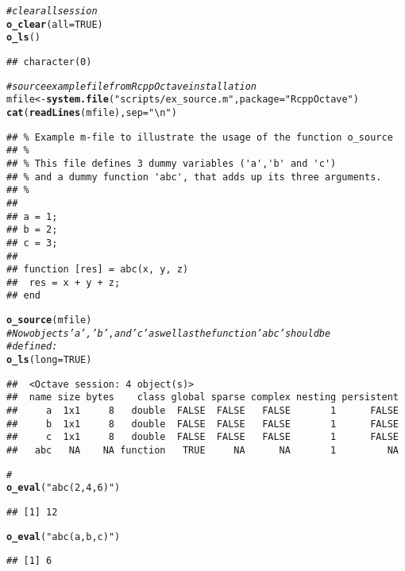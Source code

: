 \documentclass[english,10pt,a4paper]{article}\usepackage[]{graphicx}\usepackage[]{color}
\makeatletter
\newcommand{\hlnum}[1]{\textcolor[rgb]{0.686,0.059,0.569}{#1}}%
\newcommand{\hlstr}[1]{\textcolor[rgb]{0.192,0.494,0.8}{#1}}%
\newcommand{\hlcom}[1]{\textcolor[rgb]{0.678,0.584,0.686}{\textit{#1}}}%
\newcommand{\hlstd}[1]{\textcolor[rgb]{0.345,0.345,0.345}{#1}}%
\newcommand{\hlkwb}[1]{\textcolor[rgb]{0.69,0.353,0.396}{#1}}%
\newcommand{\hlkwc}[1]{\textcolor[rgb]{0.333,0.667,0.333}{#1}}%
\newcommand{\hlkwd}[1]{\textcolor[rgb]{0.737,0.353,0.396}{\textbf{#1}}}%
\newenvironment{kframe}{%
 \def\at@end@of@kframe{}%
 \ifinner\ifhmode%
  \def\at@end@of@kframe{\end{minipage}}%
  \begin{minipage}{\columnwidth}%
 \fi\fi%
 \def\FrameCommand##1{\hskip\@totalleftmargin \hskip-\fboxsep
 \colorbox{shadecolor}{##1}\hskip-\fboxsep
     \hskip-\linewidth \hskip-\@totalleftmargin \hskip\columnwidth}%
 \MakeFramed {\advance\hsize-\width
   \@totalleftmargin\z@ \linewidth\hsize
   \@setminipage}}%
 {\par\unskip\endMakeFramed%
 \at@end@of@kframe}
\newenvironment{knitrout}{}{} %
\makeatother
\begin{document}
\begin{knitrout}
\color{fgcolor}\begin{kframe}
\begin{alltt}
\hlcom{# clear all session}
\hlkwd{o_clear}\hlstd{(}\hlkwc{all} \hlstd{=} \hlnum{TRUE}\hlstd{)}
\hlkwd{o_ls}\hlstd{()}
\end{alltt}
\begin{verbatim}
## character(0)
\end{verbatim}
\begin{alltt}
\hlcom{# source example file from RcppOctave installation}
\hlstd{mfile} \hlkwb{<-} \hlkwd{system.file}\hlstd{(}\hlstr{"scripts/ex_source.m"}\hlstd{,} \hlkwc{package} \hlstd{=} \hlstr{"RcppOctave"}\hlstd{)}
\hlkwd{cat}\hlstd{(}\hlkwd{readLines}\hlstd{(mfile),} \hlkwc{sep} \hlstd{=} \hlstr{"\textbackslash{}n"}\hlstd{)}
\end{alltt}
\begin{verbatim}
## % Example m-file to illustrate the usage of the function o_source
## %
## % This file defines 3 dummy variables ('a','b' and 'c') 
## % and a dummy function 'abc', that adds up its three arguments.
## % 
## 
## a = 1;
## b = 2;
## c = 3;
## 
## function [res] = abc(x, y, z)
## 	res = x + y + z; 
## end
\end{verbatim}
\begin{alltt}
\hlkwd{o_source}\hlstd{(mfile)}
\hlcom{# Now objects 'a', 'b', and 'c' as well as the function 'abc' should be}
\hlcom{# defined:}
\hlkwd{o_ls}\hlstd{(}\hlkwc{long} \hlstd{=} \hlnum{TRUE}\hlstd{)}
\end{alltt}
\begin{verbatim}
##  <Octave session: 4 object(s)>
##  name size bytes    class global sparse complex nesting persistent
##     a  1x1     8   double  FALSE  FALSE   FALSE       1      FALSE
##     b  1x1     8   double  FALSE  FALSE   FALSE       1      FALSE
##     c  1x1     8   double  FALSE  FALSE   FALSE       1      FALSE
##   abc   NA    NA function   TRUE     NA      NA       1         NA
\end{verbatim}
\begin{alltt}
\hlcom{# }
\hlkwd{o_eval}\hlstd{(}\hlstr{"abc(2, 4, 6)"}\hlstd{)}
\end{alltt}
\begin{verbatim}
## [1] 12
\end{verbatim}
\begin{alltt}
\hlkwd{o_eval}\hlstd{(}\hlstr{"abc(a, b, c)"}\hlstd{)}
\end{alltt}
\begin{verbatim}
## [1] 6
\end{verbatim}
\end{kframe}
\end{knitrout}
\end{document}
